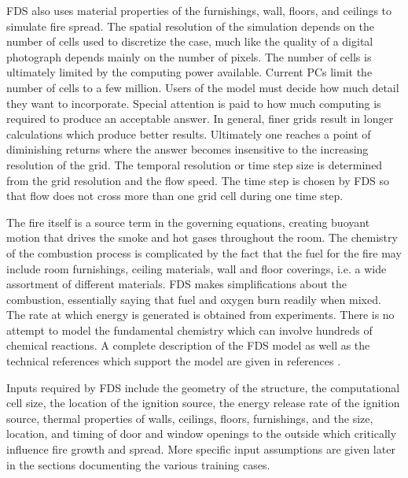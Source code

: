\documentclass[11pt]{book}
\begin{document}
FDS also uses material properties of the furnishings, wall, floors, and ceilings to simulate fire spread.  The spatial resolution of the simulation depends on the number of cells used to discretize the case, much like the quality of a digital photograph depends mainly on the number of pixels. The number of cells is ultimately limited by the computing power available. Current PCs limit the number of cells to a few million. Users of the model must decide how much detail they want to incorporate. Special attention is paid to how much computing is required to produce an acceptable answer. In general, finer grids result in longer calculations which produce better results. Ultimately one reaches a point of diminishing returns where the answer becomes insensitive to the increasing resolution of the grid.  The temporal resolution or time step size is determined from the grid resolution and the flow speed. The time step is chosen by FDS so that flow does not cross more than one grid cell during one time step.

The fire itself is a source term in the governing equations, creating buoyant motion that drives the smoke and hot gases throughout the room. The chemistry of the combustion process is complicated by the fact that the fuel for the fire may include room furnishings, ceiling materials, wall and floor coverings, i.e. a wide assortment of different materials. FDS makes simplifications about the combustion, essentially saying that fuel and oxygen burn readily when mixed. The rate at which energy is generated is obtained from experiments. There is no attempt to model the fundamental chemistry which can involve hundreds of chemical reactions.  A complete description of the FDS model as well as the technical references which support the model are given in references \cite{FDS_Tech_Guide_5,FDS_Users_Guide_5}.

Inputs required by FDS include the geometry of the structure, the computational cell size, the location of the ignition source, the energy release rate of the ignition source, thermal properties of walls, ceilings, floors, furnishings, and the size, location, and timing of door and window openings to the outside which critically influence fire growth and spread.  More specific input assumptions are given later in the sections documenting the various training cases.
\end{document}
